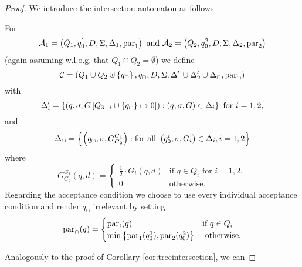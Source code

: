 \begin{proof}
  We introduce the intersection automaton as follows
  \begin{definition}
    For 
    \begin{equation*}
      \mathcal{A}_{1} = \left(
        Q_{1}, q^{1}_{0}, D, \Sigma, \Delta_{1}, \operatorname{par}_{1}\right)
      \text{ and }
      \mathcal{A}_{2} = \left(
        Q_{2}, q^{2}_{0}, D, \Sigma, \Delta_{2}, \operatorname{par}_{2}\right)
    \end{equation*}
    (again assuming w.l.o.g. that $Q_{1}\cap Q_{2} = \emptyset$) we define
    \begin{equation*}
      \mathcal{C} = \left(
        Q_{1}\cup Q_{2}\uplus\left\{q_{\cap}\right\}, q_{\cap}, D, \Sigma, 
        \Delta_{1}'\cup\Delta_{2}'\cup\Delta_{\cap}, \operatorname{par}_{\cap}
      \right)
    \end{equation*}
    with
    \begin{equation*}
      \Delta_{i}' = \left\{
        \left(q,\sigma,G\left[Q_{3-i}\cup\left\{
          q_{\cap}\right\}\mapsto 0\right]\right):\left(q,\sigma, G\right)\in\Delta_{i}
      \right\}\text{ for }i = 1,2,
    \end{equation*}
    and
    \begin{equation*}
      \Delta_{\cap} = \left\{
        \left(q_{\cap},\sigma, G^{G_{1}}_{G_{2}}\right): \text{for all }
        \left(q^{i}_{0},\sigma, G_{i}\right)\in\Delta_{i}, i = 1,2
      \right\}
    \end{equation*}
    where
    \begin{equation*}
      G^{G_{1}}_{G_{2}}(q,d) = \begin{cases}
        \frac{1}{2}\cdot G_{i}(q,d)&\text{if }q\in Q_{i}\text{ for }i = 1,2,\\
        0&\text{otherwise}.
      \end{cases}
    \end{equation*}
    Regarding the acceptance condition we choose to use every individual 
    acceptance condition and render $q_{\cap}$ irrelevant by setting
    \begin{equation*}
      \operatorname{par}_{\cap}(q) = \begin{cases}
        \operatorname{par}_{i}(q)&\text{if }q\in Q_{i}\\
        \min\left\{\operatorname{par}_{1}(q_{0}^{1}),\operatorname{par}_{2}(q_{0}^{2})\right\}&\text{
          otherwise}.
      \end{cases}
    \end{equation*}
  \end{definition}
  Analogously to the proof of Corollary \ref{cor:treeintersection}, we can

\end{proof}
